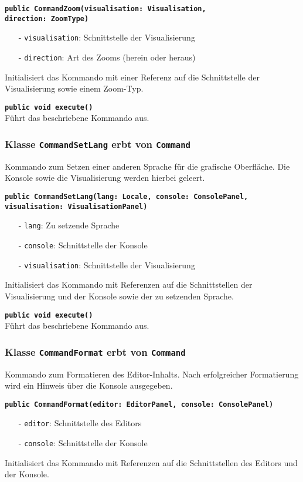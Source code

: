 \documentclass[parskip=full,11pt,twoside]{scrartcl}
\begin{document}
\textbf{\texttt{public CommandZoom(visualisation: Visualisation,\\direction: ZoomType)}}\\
\begin{itemize}[noitemsep]
	\item[-] \texttt{visualisation}: Schnittstelle der Visualisierung
	\item[-] \texttt{direction}: Art des Zooms (herein oder heraus)
\end{itemize}
Initialisiert das Kommando mit einer Referenz auf die Schnittstelle der Visualisierung sowie einem Zoom-Typ.

\textbf{\texttt{public void execute()}}\\
Führt das beschriebene Kommando aus.

\subsubsection{Klasse \texttt{CommandSetLang} erbt von \texttt{Command}}
Kommando zum Setzen einer anderen Sprache für die grafische Oberfläche. Die Konsole sowie die Visualisierung werden hierbei geleert.

\textbf{\texttt{public CommandSetLang(lang: Locale, console: ConsolePanel,\\visualisation: VisualisationPanel)}}\\
\begin{itemize}[noitemsep]
	\item[-] \texttt{lang}: Zu setzende Sprache
	\item[-] \texttt{console}: Schnittstelle der Konsole
	\item[-] \texttt{visualisation}: Schnittstelle der Visualisierung
\end{itemize}
Initialisiert das Kommando mit Referenzen auf die Schnittstellen der Visualisierung und der Konsole sowie der zu setzenden Sprache.

\textbf{\texttt{public void execute()}}\\
Führt das beschriebene Kommando aus.

\subsubsection{Klasse \texttt{CommandFormat} erbt von \texttt{Command}}
Kommando zum Formatieren des Editor-Inhalts. Nach erfolgreicher Formatierung wird ein Hinweis über die Konsole ausgegeben.

\textbf{\texttt{public CommandFormat(editor: EditorPanel, console: ConsolePanel)}}\\
\begin{itemize}[noitemsep]
	\item[-] \texttt{editor}: Schnittstelle des Editors
	\item[-] \texttt{console}: Schnittstelle der Konsole
\end{itemize}
Initialisiert das Kommando mit Referenzen auf die Schnittstellen des Editors und der Konsole.
\end{document}
